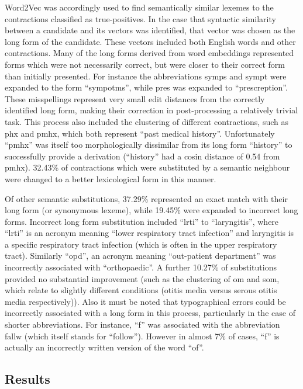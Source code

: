 Word2Vec was accordingly used to find semantically similar lexemes to the contractions classified as true-positives. In the case that syntactic similarity between a candidate and its vectors was identified, that vector was chosen as the
long form of the candidate. These vectors included both English words and other contractions.
Many of the long forms derived from word embeddings represented forms which were not necessarily
correct, but were closer to their correct form than initially presented. For instance the abbreviations symps
and sympt were expanded to the form “sympotms”, while pres was expanded to “prescreption”. These
misspellings represent very small edit distances from the correctly identified long form, making their
correction in post-processing a relatively trivial task. This process also included the clustering of different
contractions, such as phx and pmhx, which both represent “past medical history”. Unfortunately “pmhx” was
itself too morphologically dissimilar from its long form “history” to successfully provide a derivation
(“history” had a cosin distance of 0.54 from pmhx). 32.43\% of contractions which were substituted by a
semantic neighbour were changed to a better lexicological form in this manner.

Of other semantic substitutions, 37.29\% represented an exact match with their long form (or synonymous
lexeme), while 19.45\% were expanded to incorrect long forms. Incorrect long form substitution included
“lrti” to “laryngitis”, where “lrti” is an acronym meaning “lower respiratory tract infection” and laryngitis is
a specific respiratory tract infection (which is often in the upper respiratory tract). Similarly “opd”, an
acronym meaning “out-patient department” was incorrectly associated with “orthopaedic”. A further 10.27\%
of substitutions provided no substantial improvement (such as the clustering of om and som, which relate to
slightly different conditions (otitis media versus serous otitis media respectively)). Also it must be noted that
typographical errors could be incorrectly associated with a long form in this process, particularly in the case
of shorter abbreviations. For instance, “f” was associated with the abbreviation fallw (which itself stands for
“follow”). However in almost 7\% of cases, “f” is actually an incorrectly written version of the word “of”.



\subsection{Results}

